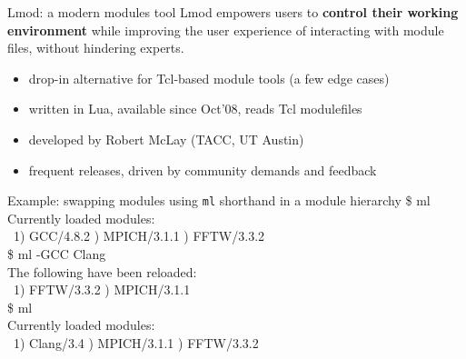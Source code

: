 \documentclass[10pt,xcolor={usenames,dvipsnames}]{beamer}
\begin{document}
\begin{frame}{Lmod: a modern modules tool}
    Lmod empowers users to \textbf{control their working environment} while improving the user
    experience of interacting with module files, without hindering experts.
    \begin{itemize}
        \item drop-in alternative for Tcl-based module tools (a few
          edge cases)
        \item written in Lua, available since Oct'08, reads Tcl modulefiles
        \item developed by Robert McLay (TACC, UT Austin)
        \item frequent releases, driven by community demands and feedback
    \end{itemize}
    \begin{minipage}{0.9\textwidth}
    \begin{exampleblock}{Example: swapping modules using \texttt{ml} shorthand in a module hierarchy}
        \ttfamily
        \$ ml\\
        Currently loaded modules:\\
        ~1) GCC/4.8.2 ) MPICH/3.1.1 ) FFTW/3.3.2\\
        \$ ml -GCC Clang\\
        The following have been reloaded:\\
        ~1) FFTW/3.3.2 ) MPICH/3.1.1\\
        \$ ml\\
        Currently loaded modules:\\
        ~1) Clang/3.4 ) MPICH/3.1.1 ) FFTW/3.3.2
    \end{exampleblock}
    \end{minipage}
\end{frame}

\end{document}
